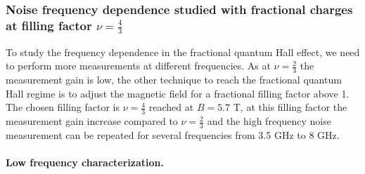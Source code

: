 \subsubsection*{Noise frequency dependence studied with fractional charges at filling factor $\nu = \frac{4}{3}$}

To study the frequency dependence in the fractional quantum Hall effect, we need to perform more measurements at different frequencies.
As at $\nu = \frac{2}{3}$ the measurement gain is low, the other technique to reach the fractional quantum Hall regime is to adjust the magnetic field for a fractional filling factor above 1.
The chosen filling factor is $\nu = \frac{4}{3}$ reached at $B = 5.7$ T, at this filling factor the measurement gain increase compared to $\nu = \frac{2}{3}$ and the high frequency noise measurement can be repeated for several frequencies from 3.5 GHz to 8 GHz.

\paragraph*{Low frequency characterization.}

